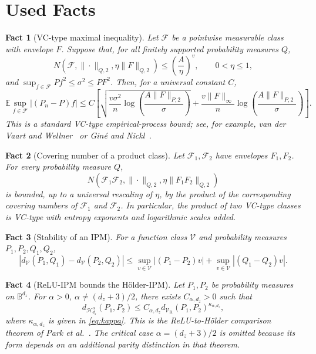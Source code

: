 \documentclass[11pt]{article}
\newtheorem{fact}{Fact}[section]
\theoremstyle{remark}
\newcommand{\E}{\mathbb{E}}
\newcommand{\cV}{\mathcal{V}}
\newcommand{\cH}{\mathcal{H}}
\newcommand{\cF}{\mathcal{F}}
\newcommand{\cB}{\mathbb{B}}
\begin{document}
\section{Used Facts}

\begin{fact}[VC-type maximal inequality]
\label{fact:maximal}
Let $\cF$ be a pointwise measurable class with envelope $F$.  Suppose that, for
all finitely supported probability measures $Q$,
\[
  N(\cF,\|\cdot\|_{Q,2},\eta\|F\|_{Q,2})
  \le
  \left(\frac{A}{\eta}\right)^v,
  \qquad 0<\eta\le1,
\]
and $\sup_{f\in\cF}Pf^2\le\sigma^2\le PF^2$.  Then, for a universal constant
$C$,
\[
  \E\sup_{f\in\cF}|(P_n-P)f|
  \le
  C\left[
    \sqrt{
      \frac{v\sigma^2}{n}
      \log\!\left(\frac{A\|F\|_{P,2}}{\sigma}\right)
    }
    +
    \frac{v\|F\|_\infty}{n}
    \log\!\left(\frac{A\|F\|_{P,2}}{\sigma}\right)
  \right].
\]
This is a standard VC-type empirical-process bound; see, for example,
van der Vaart and Wellner~\cite{vdvw1996} or Gin\'e and Nickl~\cite{gine2016}.
\end{fact}

\begin{fact}[Covering number of a product class]
\label{fact:product-cover}
Let $\cF_1,\cF_2$ have envelopes $F_1,F_2$.  For every probability measure $Q$,
\[
  N\!\left(
    \cF_1\cF_2,\|\cdot\|_{Q,2},
    \eta\|F_1F_2\|_{Q,2}
  \right)
\]
is bounded, up to a universal rescaling of $\eta$, by the product of the
corresponding covering numbers of $\cF_1$ and $\cF_2$.  In particular, the
product of two VC-type classes is VC-type with entropy exponents and logarithmic
scales added.
\end{fact}

\begin{fact}[Stability of an IPM]
\label{fact:ipm-stability}
For a function class $\cV$ and probability measures $P_1,P_2,Q_1,Q_2$,
\[
  \left|
    d_{\cV}(P_1,Q_1)-d_{\cV}(P_2,Q_2)
  \right|
  \le
  \sup_{v\in\cV}|(P_1-P_2)v|
  +
  \sup_{v\in\cV}|(Q_1-Q_2)v|.
\]
\end{fact}

\begin{fact}[ReLU-IPM bounds the H\"older-IPM]
\label{fact:relu-holder}
Let $P_1,P_2$ be probability measures on $\cB^{d_z}$.  For
$\alpha>0$, $\alpha\neq(d_z+3)/2$, there exists $C_{\alpha,d_z}>0$ such that
\[
  d_{\cH_{d_z}^{\alpha}}(P_1,P_2)
  \le
  C_{\alpha,d_z}
  d_{\cV_{\mathrm{R}}}(P_1,P_2)^{\kappa_{\alpha,d_z}},
\]
where $\kappa_{\alpha,d_z}$ is given in \eqref{eq:kappa}.  This is the
ReLU-to-H\"older comparison theorem of Park et al.~\cite{park2025relu}.  The
critical case $\alpha=(d_z+3)/2$ is omitted because its form depends on an
additional parity distinction in that theorem.
\end{fact}
\end{document}
